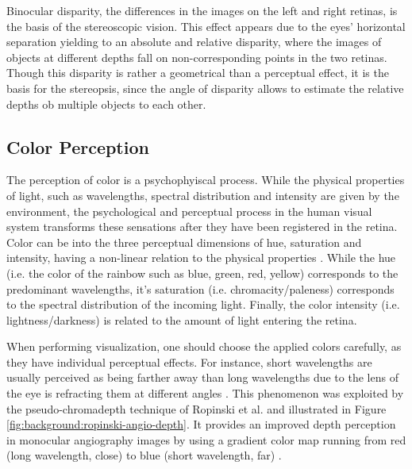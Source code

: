 Binocular disparity, the differences in the images on the left and right retinas, is the basis of the stereoscopic vision.
This effect appears due to the eyes' horizontal separation yielding to an absolute and relative disparity, where the images of objects at different depths fall on non-corresponding points in the two retinas.
Though this disparity is rather a geometrical than a perceptual effect, it is the basis for the stereopsis, since the angle of disparity allows to estimate the relative depths ob multiple objects to each other.


\subsection{Color Perception}
\label{sec:background:colorperception}
The perception of color is a psychophyiscal process.
While the physical properties of light, such as wavelengths, spectral distribution and intensity are given by the environment, the psychological and perceptual process in the human visual system transforms these sensations after they have been registered in the retina.
Color can be  into the three perceptual dimensions of hue, saturation and intensity, having a non-linear relation to the physical properties \cite{Goldstein:2013:Perception}.
While the hue (i.e. the color of the rainbow such as blue, green, red, yellow) corresponds to the predominant wavelengths, it's saturation (i.e. chromacity/paleness) corresponds to the spectral distribution of the incoming light.
Finally, the color intensity (i.e. lightness/darkness) is related to the amount of light entering the retina.

When performing visualization, one should choose the applied colors carefully, as they have individual perceptual effects.
For instance, short wavelengths are usually perceived as being farther away than long wavelengths due to the lens of the eye is refracting them at different angles \cite{Steenblik:1987:Chromadepth}.
This phenomenon was exploited by the pseudo-chromadepth technique of Ropinski et al. and illustrated in Figure \ref{fig:background:ropinski-angio-depth}.
It provides an improved depth perception in monocular angiography images by using a gradient color map running from red (long wavelength, close) to blue (short wavelength, far) \cite{Ropinski:2006:Chromadepth}.

